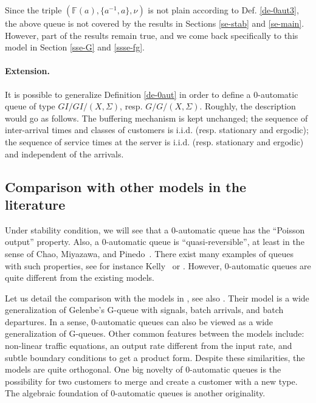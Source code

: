 \documentclass[11pt,a4paper]{article}
\theoremstyle{remark}
\def\Blackboardfont{\mathbb}
\def\F{{\Blackboardfont F}}
\begin{document}
\medskip

Since the triple $(\F(a),\{a^{-1},a\},\nu)$ is not plain according to
Def. \ref{de-0aut3}, the above queue is not covered by the results in
Sections \ref{se-stab} and \ref{se-main}. However, part of the results
remain true, and we come back specifically to this model in 
Section \ref{sse-G} and \ref{ssse-fg}. 







\paragraph{Extension.}
It is possible to generalize Definition \ref{de-0aut} in
order to define a 0-automatic queue of type $GI/GI/(X,\Sigma)$, resp.
$G/G/(X,\Sigma)$.  Roughly, the description would go as follows. The
buffering mechanism is kept unchanged; the sequence of inter-arrival
times and classes of customers is i.i.d. (resp. stationary and ergodic);
the sequence of service times at the server is i.i.d. (resp. stationary
and ergodic) and independent of the arrivals.

\subsection{Comparison with other models in the literature}

Under stability condition, we will see that a 0-automatic queue has
the ``Poisson output'' property. Also, a 0-automatic queue is
``quasi-reversible'', at least in the sense of Chao, Miyazawa, and
Pinedo~\cite[Definition 3.4]{CMPi}.  
There exist many examples of queues with such properties, see for
instance Kelly~\cite{kell79} or \cite{CMPi}. 
However, 0-automatic queues are
quite different from the existing models. 

Let us detail the comparison with the models in \cite{CMPi},
see also \cite{ChMi00}. Their model is a wide generalization of
Gelenbe's G-queue with signals, batch arrivals, and batch departures. 
In a sense, 0-automatic queues can also be viewed as a wide
generalization of G-queues. Other common features between the models 
include: non-linear traffic equations, an output rate different from
the input rate, and subtle boundary conditions to get a product form. 
Despite these similarities, the models are quite orthogonal. 
One big novelty of 0-automatic queues is the possibility for
two customers to merge and create a customer with a new
type. The algebraic foundation of 0-automatic queues is another
originality. 
\end{document}
